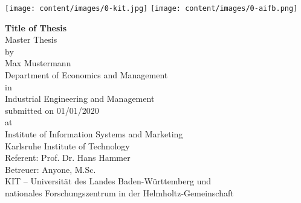 
\begin{titlepage}

\begin{minipage}{\textwidth}
  \texttt{[image: content/images/0-kit.jpg]}
  \hfill
  \texttt{[image: content/images/0-aifb.png]}
\end{minipage}

\vspace*{1.5cm}
\begin{center}
  \textbf{{\Huge Title of Thesis}}
  \vspace*{1.5cm}\\
  {\Large Master Thesis}\\
  {\Large by} \\
  {\Large Max Mustermann}
  \vspace*{1.5cm}\\
  Department of Economics and Management
  \vspace*{0.5cm}\\
  in\\
  Industrial Engineering and Management
  \vspace*{1.5cm}\\
  submitted on 01/01/2020\\
  at\\
  Institute of Information Systems and Marketing\\
  Karlsruhe Institute of Technology
  \vspace*{1.5cm}\\
  Referent: Prof. Dr. Hans Hammer\\
  Betreuer: Anyone, M.Sc.
  \vspace*{1.5cm}\\
  {\scriptsize KIT -- Universität des Landes Baden-Württemberg und}\\
  {\scriptsize nationales Forschungszentrum in der Helmholtz-Gemeinschaft}\\
\end{center}
\end{titlepage}




